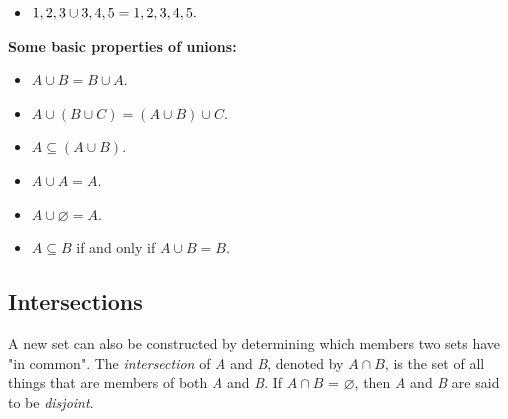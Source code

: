 \begin{itemize}
    \item $ \\{1, 2, 3\\} \cup \\{3, 4, 5\\} = \\{1, 2, 3, 4, 5\\}.$
\end{itemize}

\textbf{Some basic properties of unions:}



\begin{itemize}
    \item $ A \cup B = B \cup A.$
\end{itemize}

\begin{itemize}
    \item $ A \cup (B \cup C) = (A \cup B) \cup C.$
\end{itemize}

\begin{itemize}
    \item $ A \subseteq (A \cup B).$
\end{itemize}

\begin{itemize}
    \item $ A \cup A = A.$
\end{itemize}

\begin{itemize}
    \item $ A \cup \varnothing = A.$
\end{itemize}

\begin{itemize}
    \item $ A \subseteq B$ if and only if $A \cup B = B$.
\end{itemize}


\subsection{Intersections}
\label{sss:inte-c67e}




A new set can also be constructed by determining which members two sets have "in common".
The \textit{intersection} of \textit{A} and \textit{B}, denoted by $A \cap B$, is the set
of all things that are members of both \textit{A} and \textit{B}. If $A \cap B$ =
$\varnothing$, then \textit{A} and \textit{B} are said to be \textit{disjoint}.



